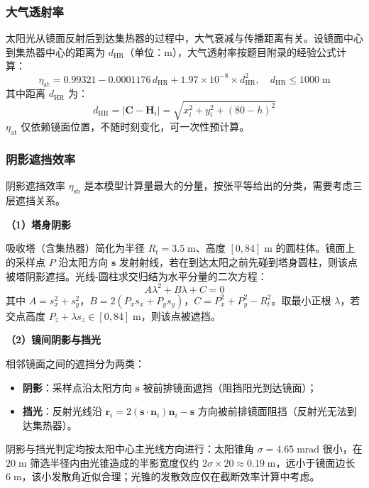 \documentclass[12pt,a4paper,fontset=fandol]{ctexart}
\begin{document}
\subsubsection{大气透射率}

太阳光从镜面反射后到达集热器的过程中，大气衰减与传播距离有关。设镜面中心到集热器中心的距离为 $d_{\mathrm{HR}}$（单位：m），大气透射率按题目附录的经验公式计算\cite{4}：
\begin{equation}
    \eta_{\mathrm{at}} = 0.99321 - 0.0001176\,d_{\mathrm{HR}} + 1.97 \times 10^{-8} \times d_{\mathrm{HR}}^{2}, \quad d_{\mathrm{HR}} \leq 1000\;\mathrm{m}
    \label{eq:eta_at}
\end{equation}
其中距离 $d_{\mathrm{HR}}$ 为：
\begin{equation}
    d_{\mathrm{HR}} = |\mathbf{C} - \mathbf{H}_i| = \sqrt{x_i^2 + y_i^2 + (80 - h)^2}
    \label{eq:d_HR}
\end{equation}
$\eta_{\mathrm{at}}$ 仅依赖镜面位置，不随时刻变化，可一次性预计算。

\subsubsection{阴影遮挡效率}

阴影遮挡效率 $\eta_{\mathrm{sb}}$ 是本模型计算量最大的分量，按张平等\cite{2}给出的分类，需要考虑三层遮挡关系。

\textbf{（1）塔身阴影}

吸收塔（含集热器）简化为半径 $R_t = 3.5\;\mathrm{m}$、高度 $[0, 84]\;\mathrm{m}$ 的圆柱体。镜面上的采样点 $P$ 沿太阳方向 $\mathbf{s}$ 发射射线，若在到达太阳之前先碰到塔身圆柱，则该点被塔阴影遮挡。光线-圆柱求交归结为水平分量的二次方程：
\begin{equation}
    A\lambda^2 + B\lambda + C = 0
    \label{eq:ray_cyl}
\end{equation}
其中 $A = s_x^2 + s_y^2$，$B = 2(P_x s_x + P_y s_y)$，$C = P_x^2 + P_y^2 - R_t^2$。取最小正根 $\lambda$，若交点高度 $P_z + \lambda s_z \in [0, 84]\;\mathrm{m}$，则该点被遮挡。

\textbf{（2）镜间阴影与挡光}

相邻镜面之间的遮挡分为两类：
\begin{itemize}
    \item \textbf{阴影}：采样点沿太阳方向 $\mathbf{s}$ 被前排镜面遮挡（阻挡阳光到达镜面）；
    \item \textbf{挡光}：反射光线沿 $\mathbf{r}_i = 2(\mathbf{s} \cdot \mathbf{n}_i)\mathbf{n}_i - \mathbf{s}$ 方向被前排镜面阻挡（反射光无法到达集热器）。
\end{itemize}
阴影与挡光判定均按太阳中心主光线方向进行：太阳锥角 $\sigma = 4.65\;\mathrm{mrad}$ 很小，在 $20\;\mathrm{m}$ 筛选半径内由光锥造成的半影宽度仅约 $2\sigma \times 20 \approx 0.19\;\mathrm{m}$，远小于镜面边长 $6\;\mathrm{m}$，该小发散角近似合理；光锥的发散效应仅在截断效率计算中考虑。
\end{document}
